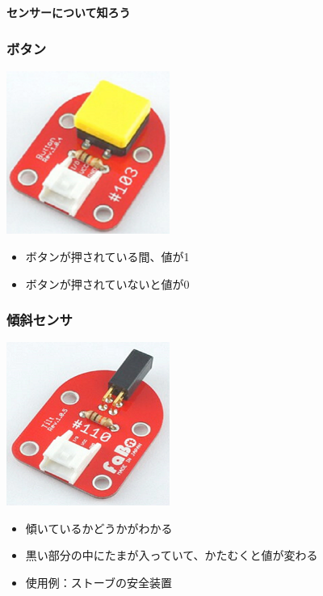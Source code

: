 \begin{frame}[plain]
    \begin{center}
        \vspace{48pt}
        {\huge\bf センサーについて知ろう}
    \end{center}
\end{frame}

\begin{frame}
    \frametitle{ボタン}
    \begin{center}
        \includegraphics[width=0.4\textwidth]{images/chap05/text05-img028.png}
        \begin{itemize}
            \item ボタンが押されている間、値が1
            \item ボタンが押されていないと値が0
        \end{itemize}
    \end{center}
\end{frame}

\begin{frame}
    \frametitle{傾斜センサ}
    \begin{center}
        \includegraphics[width=0.4\textwidth]{images/chap05/text05-img018.png}
        \begin{itemize}
            \item 傾いているかどうかがわかる
            \item 黒い部分の中にたまが入っていて、かたむくと値が変わる
            \item 使用例：ストーブの安全装置
        \end{itemize}
    \end{center}
\end{frame}

